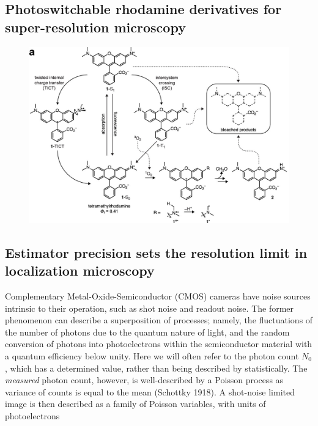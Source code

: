 \documentclass{ucetd}
\begin{document}
\subsection{Photoswitchable rhodamine derivatives for super-resolution microscopy}


\begin{figure}
\begin{center}
\includegraphics[width=14cm]{Rhodamines.png}
\end{center}
\end{figure}




\subsection{Estimator precision sets the resolution limit in localization microscopy}

Complementary Metal-Oxide-Semiconductor (CMOS) cameras have noise sources intrinsic to their operation, such as shot noise and readout noise. The former phenomenon can describe a superposition of processes; namely, the fluctuations of the number of photons due to the quantum nature of light, and the random conversion of photons into photoelectrons within the semiconductor material with a quantum efficiency below unity. Here we will often refer to the photon count $N_{0}$, which has a determined value, rather than being described by statistically. The \emph{measured} photon count, however, is well-described by a Poisson process as variance of counts is equal to the mean (Schottky 1918). A shot-noise limited image is then described as a family of Poisson variables, with units of photoelectrons
\end{document}
